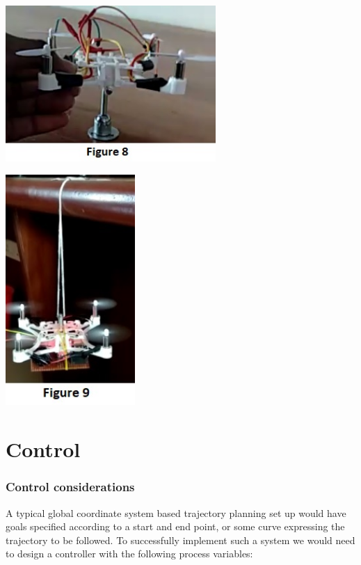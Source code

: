 \documentclass[9pt]{article}
\begin{document}
\begin{center}
\includegraphics[width=0.6\textwidth]{31.jpg}
\end{center}

\begin{center}
\includegraphics[width=0.37\textwidth]{32.jpg}
\end{center}

\part{Control}

\section{Control considerations}

A typical global coordinate system based trajectory planning set up would have goals specified according to a start and end point, or some curve expressing the trajectory to be followed. To successfully implement such a system we would need to design a controller with the following process variables:\\
\end{document}
